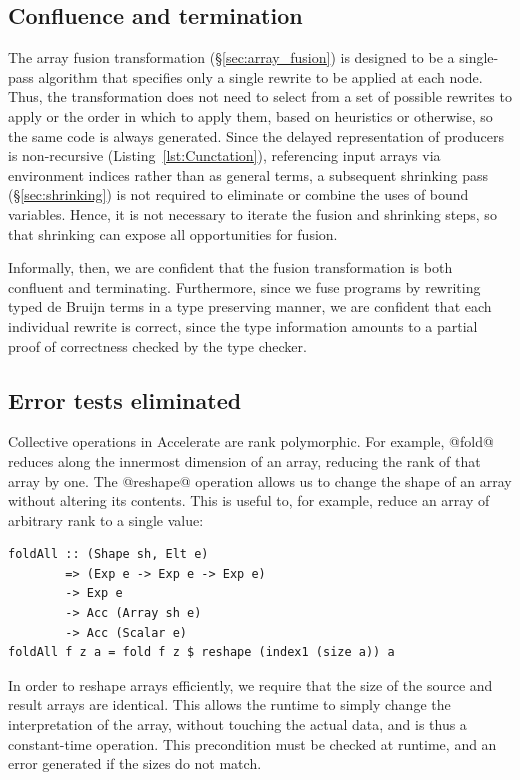 \subsection{Confluence and termination}

The array fusion transformation (\S\ref{sec:array_fusion}) is
designed to be a single-pass algorithm that specifies only a single rewrite to
be applied at each node. Thus, the transformation does not need to select from a
set of possible rewrites to apply or the order in which to apply them, based on
heuristics or otherwise, so the same code is always generated. Since the delayed
representation of producers is non-recursive (Listing~\ref{lst:Cunctation}),
referencing input arrays via environment indices rather than as general terms, a
subsequent shrinking pass (\S\ref{sec:shrinking}) is not required to eliminate
or combine the uses of bound variables. Hence, it is not necessary to iterate
the fusion and shrinking steps, so that shrinking can expose all opportunities
for fusion.

Informally, then, we are confident that the fusion transformation is both
confluent and terminating. Furthermore, since we fuse programs by rewriting
typed de Bruijn terms in a type preserving manner, we are confident that each
individual rewrite is correct, since the type information amounts to a partial
proof of correctness checked by the type checker.


\subsection{Error tests eliminated}

Collective operations in Accelerate are rank polymorphic. For example, @fold@
reduces along the innermost dimension of an array, reducing the rank of that
array by one. The @reshape@ operation allows us to change the shape of an array
without altering its contents. This is useful to, for example, reduce an array
of arbitrary rank to a single value:
%
\begin{lstlisting}[style=haskell]
foldAll :: (Shape sh, Elt e)
        => (Exp e -> Exp e -> Exp e)
        -> Exp e
        -> Acc (Array sh e)
        -> Acc (Scalar e)
foldAll f z a = fold f z $ reshape (index1 (size a)) a
\end{lstlisting}
%
In order to reshape arrays efficiently, we require that the size of the source
and result arrays are identical. This allows the runtime to simply change the
interpretation of the array, without touching the actual data, and is thus a
constant-time operation. This precondition must be checked at runtime, and an
error generated if the sizes do not match.

